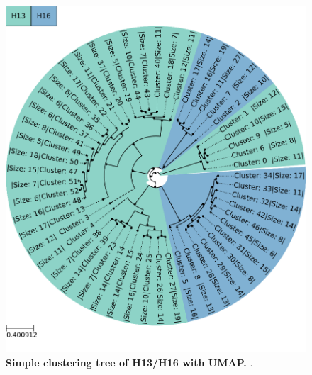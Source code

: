 





\FloatBarrier

\begin{figure}[!hbt]
    \centering
    \includegraphics[width=\textwidth]{UMAP/Clustertree_Segment_4_H_Simple.pdf}
    \caption[Simple clustering tree of H13/H16 with UMAP]{\textbf{Simple clustering tree of H13/H16 with UMAP.} .}
    \label{fig:Simple_Clustertree_UMAP}
\end{figure}

